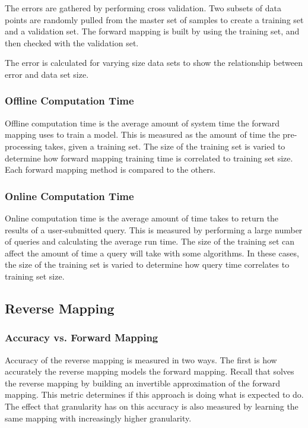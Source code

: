 The errors are gathered by performing cross validation.
Two subsets of data points are randomly pulled from the master set of samples to create a training set and a validation set.
The forward mapping is built by using the training set, and then checked with the validation set.

The error is calculated for varying size data sets to show the relationship between error and data set size.

  \subsubsection{Offline Computation Time}

Offline computation time is the average amount of system time the forward mapping uses to train a model.
This is measured as the amount of time the pre-processing takes, given a training set.
The size of the training set is varied to determine how forward mapping training time is correlated to training set size.
Each forward mapping method is compared to the others.

  \subsubsection{Online Computation Time}

Online computation time is the average amount of time \fw takes to return the results of a user-submitted query.
This is measured by performing a large number of queries and calculating the average run time.
The size of the training set can affect the amount of time a query will take with some algorithms.
In these cases, the size of the training set is varied to determine how query time correlates to training set size.

 \subsection{Reverse Mapping}

  \subsubsection{Accuracy vs. Forward Mapping}
Accuracy of the reverse mapping is measured in two ways.
The first is how accurately the reverse mapping models the forward mapping.
Recall that \fw solves the reverse mapping by building an invertible approximation of the forward mapping.
This metric determines if this approach is doing what is expected to do.
The effect that granularity has on this accuracy is also measured by learning the same mapping with increasingly higher granularity.

